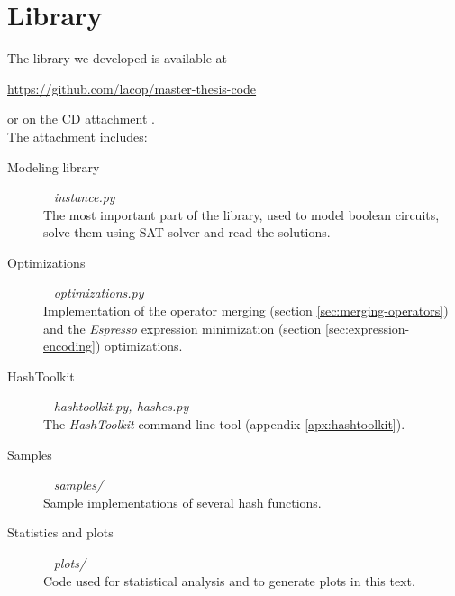 \chapter{Library}
\label{apx:library}

The library  we developed is available at
\begin{center}
\url{https://github.com/lacop/master-thesis-code}
\end{center}
or on the CD attachment \citep{papay2016code}.
~\\

\noindent The attachment includes:
\begin{description}
\item[Modeling library] ~ \emph{instance.py} \\
The most important part of the library, used to model boolean circuits, solve them using SAT solver and read the solutions.

\item[Optimizations] ~ \emph{optimizations.py} \\
Implementation of the operator merging (section \ref{sec:merging-operators}) and the \emph{Espresso} expression minimization (section \ref{sec:expression-encoding}) optimizations.

\item[HashToolkit] ~ \emph{hashtoolkit.py, hashes.py} \\
The \emph{HashToolkit} command line tool (appendix \ref{apx:hashtoolkit}).

\item[Samples] ~ \emph{samples/} \\
Sample implementations of several hash functions.

\item[Statistics and plots] ~ \emph{plots/} \\
Code used for statistical analysis and to generate plots in this text.
\end{description}